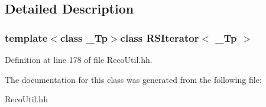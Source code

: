 \subsection{Detailed Description}
\subsubsection*{template$<$class \-\_\-\-Tp$>$class R\-S\-Iterator$<$ \-\_\-\-Tp $>$}



Definition at line 178 of file Reco\-Util.\-hh.



The documentation for this class was generated from the following file\-:\begin{DoxyCompactItemize}
\item 
Reco\-Util.\-hh\end{DoxyCompactItemize}
